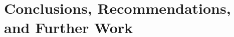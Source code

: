 \documentclass[english,twoside,10pt]{extarticle}
\begin{document}
\blindmathpaper

\section*{Conclusions, Recommendations, and Further Work}
\begin{myquote}
\lipsum[66]
\end{myquote}

\begin{small}
	\nocite{*} %
	
\end{small}
\clearpage
\end{document}
